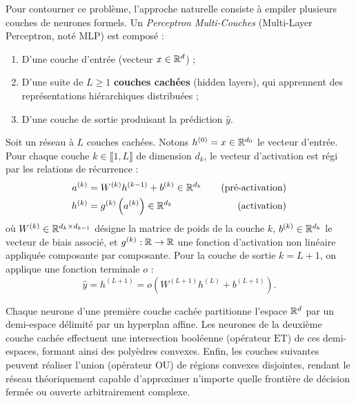 Pour contourner ce problème, l'approche naturelle consiste à empiler plusieurs couches de neurones formels. Un \emph{Perceptron Multi-Couches} (Multi-Layer Perceptron, noté MLP) est composé :
\begin{enumerate}
    \item D'une couche d'entrée (vecteur $x \in \mathbb{R}^d$) ;
    \item D'une suite de $L \geqslant 1$ \textbf{couches cachées} (hidden layers), qui apprennent des représentations hiérarchiques distribuées ;
    \item D'une couche de sortie produisant la prédiction $\hat{y}$.
\end{enumerate}

\begin{definition}
    Soit un réseau à $L$ couches cachées. Notons $h^{(0)} = x \in \mathbb{R}^{d_0}$ le vecteur d'entrée. Pour chaque couche $k \in \llbracket 1, L \rrbracket$ de dimension $d_k$, le vecteur d'activation est régi par les relations de récurrence :
    \begin{align}
        a^{(k)} &= W^{(k)} h^{(k-1)} + b^{(k)} \in \mathbb{R}^{d_k} \quad &\text{(pré-activation)} \\
        h^{(k)} &= g^{(k)}\left(a^{(k)}\right) \in \mathbb{R}^{d_k} \quad &\text{(activation)}
    \end{align}
    où $W^{(k)} \in \mathbb{R}^{d_k \times d_{k-1}}$ désigne la matrice de poids de la couche $k$, $b^{(k)} \in \mathbb{R}^{d_k}$ le vecteur de biais associé, et $g^{(k)} : \mathbb{R} \to \mathbb{R}$ une fonction d'activation non linéaire appliquée composante par composante.
    Pour la couche de sortie $k = L+1$, on applique une fonction terminale $o$ :
    \begin{equation}
        \hat{y} = h^{(L+1)} = o\left(W^{(L+1)} h^{(L)} + b^{(L+1)}\right).
    \end{equation}
\end{definition}

\begin{remark}
    Chaque neurone d'une première couche cachée partitionne l'espace $\mathbb{R}^d$ par un demi-espace délimité par un hyperplan affine. Les neurones de la deuxième couche cachée effectuent une intersection booléenne (opérateur $\mathrm{ET}$) de ces demi-espaces, formant ainsi des polyèdres convexes. Enfin, les couches suivantes peuvent réaliser l'union (opérateur $\mathrm{OU}$) de régions convexes disjointes, rendant le réseau théoriquement capable d'approximer n'importe quelle frontière de décision fermée ou ouverte arbitrairement complexe.
\end{remark}

